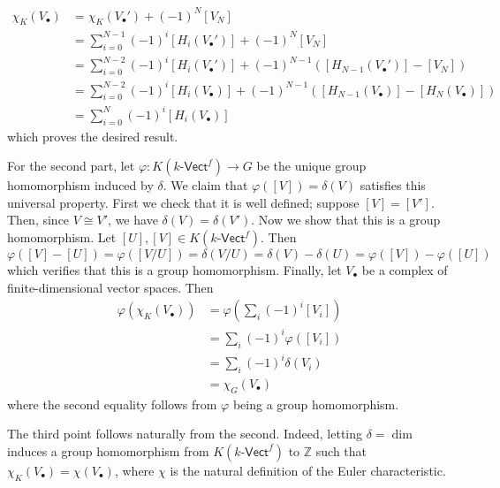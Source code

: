 \documentclass[../../master.tex]{subfiles}
\begin{document}
\begin{solution}
\begin{align*}
            \chi_K(V_{\bullet}) &= \chi_K(V_{\bullet}') + (-1)^{N} [V_N] \\
                                &= \sum_{i=0}^{N-1} (-1)^{i} [H_i(V_{\bullet}')] + (-1)^{N} [V_N] \\
                                &= \sum_{i=0}^{N-2} (-1)^{i} [H_i(V_{\bullet}')] + (-1)^{N-1} \left( [H_{N-1}(V_{\bullet}')] - [V_N] \right) \\
                                &= \sum_{i=0}^{N-2} (-1)^{i} [H_i(V_{\bullet})] + (-1)^{N-1} ( [H_{N-1}(V_{\bullet})] - [H_N(V_{\bullet})] ) \\
                                &= \sum_{i=0}^{N} (-1)^{i} [H_i(V_{\bullet})] 
        \end{align*}
        which proves the desired result.

        For the second part, let $\varphi : K(k\text{-}\mathsf{Vect}^{f}) \to G$ be the unique group homomorphism induced by $\delta$.
        We claim that $\varphi([V]) = \delta(V)$ satisfies this universal property.
        First we check that it is well defined; suppose $[V] = [V']$.
        Then, since $V \cong V'$, we have $\delta(V) = \delta(V')$.
        Now we show that this is a group homomorphism.
        Let $[U], [V] \in K(k\text{-}\mathsf{Vect}^{f})$. 
        Then
         \[
             \varphi([V] - [U]) = \varphi([V / U]) = \delta(V / U) = \delta(V) - \delta(U) = \varphi([V]) - \varphi([U])
        \]
        which verifies that this is a group homomorphism.
        Finally, let $V_{\bullet}$ be a complex of finite-dimensional vector spaces.
        Then
        \begin{align*}
            \varphi(\chi_K(V_{\bullet})) &= \varphi \left(\sum_i (-1)^{i} [V_i] \right) \\
                                         &= \sum_i (-1)^{i} \varphi([V_i]) \\
                                         &= \sum_i (-1)^{i} \delta(V_i) \\
                                         &= \chi_G(V_{\bullet})
        \end{align*}
        where the second equality follows from $\varphi$ being a group homomorphism.

        The third point follows naturally from the second.
        Indeed, letting $\delta = \dim$ induces a group homomorphism from $K(k\text{-}\mathsf{Vect}^{f})$ to $\mathbb{Z}$ such that $\chi_K(V_{\bullet}) = \chi(V_{\bullet})$, where $\chi$ is the natural definition of the Euler characteristic.


\end{solution}
\end{document}
